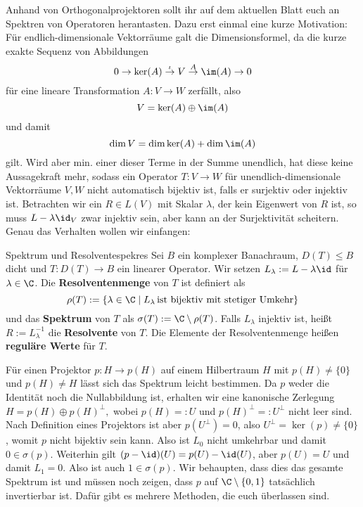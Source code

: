 Anhand von Orthogonalprojektoren sollt ihr auf dem aktuellen Blatt euch an Spektren von Operatoren herantasten. Dazu erst einmal eine kurze Motivation: Für endlich-dimensionale Vektorräume galt die Dimensionsformel, da die kurze exakte Sequenz von Abbildungen
\begin{equation}
0 \to \ker(A) \overset{\iota}\to V \overset{A}\to \im (A) \to 0
\end{equation}
für eine lineare Transformation $A: V \to W$ zerfällt, also 
\begin{equation}
V = \ker(A) \oplus \im(A)
\end{equation}
und damit
\begin{equation}
\dim V = \dim \ker(A) + \dim \im(A)
\end{equation}
gilt. Wird aber min. einer dieser Terme in der Summe unendlich, hat diese keine Aussagekraft mehr, sodass ein Operator $T: V \to W$ für unendlich-dimensionale Vektorräume $V,W$ nicht automatisch bijektiv ist, falls er surjektiv oder injektiv ist. Betrachten wir ein $R \in L(V)$ mit Skalar $\lambda$, der kein Eigenwert von $R$ ist, so muss $L - \lambda \id_V$ zwar injektiv sein, aber kann an der Surjektivität scheitern. Genau das Verhalten wollen wir einfangen:
\begin{definition}{Spektrum und Resolvente}{spekres}
Sei $B$ ein komplexer Banachraum, $D(T)\leq B$ dicht und $T: D(T) \to B$ ein linearer Operator. Wir setzen $L_\lambda := L - \lambda \id$ für $\lambda \in \C$.
Die \textbf{Resolventenmenge} von $T$ ist definiert als
	\[
		\rho(T):= \{\lambda \in \C \mid L_\lambda \, \text{ist bijektiv mit stetiger Umkehr} \}
	\]
und das \textbf{Spektrum} von $T$ als $\sigma(T):=\C \setminus \rho(T)$. Falls $L_\lambda$ injektiv ist, heißt $R := L_\lambda^{-1}$ die \textbf{Resolvente} von $T$. Die Elemente der Resolventenmenge heißen \textbf{reguläre Werte} für $T$.
\end{definition}

\begin{beispiel}
Für einen Projektor $p: H \to p(H)$ auf einem Hilbertraum $H$ mit $p(H) \neq \{0\}$ und $p(H) \neq H$ lässt sich das Spektrum leicht bestimmen. Da $p$ weder die Identität noch die Nullabbildung ist, erhalten wir eine kanonische Zerlegung $H = p(H) \oplus p(H)^\perp,$ wobei $p(H)=:U$ und $p(H)^\perp=:U^\perp$ nicht leer sind. Nach Definition eines Projektors ist aber $p(U^\perp) = 0$, also $U^\perp = \ker(p) \neq \{0\}$, womit $p$ nicht bijektiv sein kann. Also ist $L_0$ nicht umkehrbar und damit $0 \in \sigma(p)$. Weiterhin gilt $(p-\id)(U)=p(U)-\id(U)$, aber $p(U)=U$ und damit $L_1=0$. Also ist auch $1 \in \sigma(p)$. Wir behaupten, dass dies das gesamte Spektrum ist und müssen noch zeigen, dass $p$ auf $\C \setminus \{0,1\}$ tatsächlich invertierbar ist. Dafür gibt es mehrere Methoden, die euch überlassen sind.
\end{beispiel}

